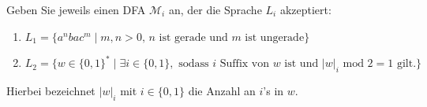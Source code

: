 
\begin{exercise}
  Geben Sie jeweils einen DFA ${\mathcal{M}}_i$ an, der die Sprache $L_i$ akzeptiert: 
  \begin{enumerate}
   \item $L_1=\{a^nbac^m\mid \text{$m,n>0$, $n$ ist gerade und $m$ ist ungerade}\}$
   \item $L_2=\big\{w \in \{0,1\}^* \mid \exists i \in \{0,1\}, \text{ sodass } i \text{ Suffix von } w \text{ ist und } |w|_i \text{ mod } 2=1 \text{ gilt.}\big\}$
  \end{enumerate}
  Hierbei bezeichnet $|w|_i$ mit $i\in \{0,1\}$ die Anzahl an $i$'s in $w$.
\end{exercise}

